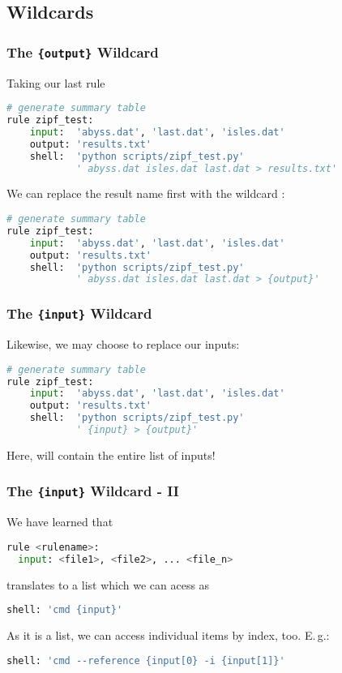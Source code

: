 \subsection{Wildcards}

\begin{frame}[fragile]
  \frametitle{The \texttt{\{output\}} Wildcard}
  Taking our last rule
  \begin{lstlisting}[language=Python,style=Python]
# generate summary table
rule zipf_test:
    input:  'abyss.dat', 'last.dat', 'isles.dat'
    output: 'results.txt'
    shell:  'python scripts/zipf_test.py' 
            ' abyss.dat isles.dat last.dat > results.txt'
  \end{lstlisting}
  We can replace the result name first with the wildcard :
  \begin{lstlisting}[language=Python,style=Python]
# generate summary table
rule zipf_test:
    input:  'abyss.dat', 'last.dat', 'isles.dat'
    output: 'results.txt'
    shell:  'python scripts/zipf_test.py' 
            ' abyss.dat isles.dat last.dat > {output}'
  \end{lstlisting}
\end{frame}

\begin{frame}[fragile]
  \frametitle{The \texttt{\{input\}} Wildcard}
  Likewise, we may choose to replace our inputs:
  \begin{lstlisting}[language=Python,style=Python]
# generate summary table
rule zipf_test:
    input:  'abyss.dat', 'last.dat', 'isles.dat'
    output: 'results.txt'
    shell:  'python scripts/zipf_test.py' 
            ' {input} > {output}'
  \end{lstlisting}
  Here,  will contain the entire list of inputs!
\end{frame}

\begin{frame}[fragile]
  \frametitle{The \texttt{\{input\}} Wildcard - II}
  We have learned that
  \begin{lstlisting}[language=Python,style=Python]
rule <rulename>:
  input: <file1>, <file2>, ... <file_n>
  \end{lstlisting}
  translates to a list which we can acess as
  \begin{lstlisting}[language=Python,style=Python]
  shell: 'cmd {input}'
  \end{lstlisting}
  As it is a list, we can access individual items by index, too. E.\,g.:
  \begin{lstlisting}[language=Python,style=Python]
  shell: 'cmd --reference {input[0} -i {input[1]}'
  \end{lstlisting}
\end{frame}

